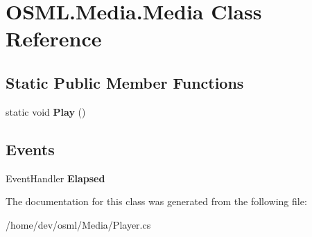 \hypertarget{classOSML_1_1Media_1_1Media}{}\section{O\+S\+M\+L.\+Media.\+Media Class Reference}
\label{classOSML_1_1Media_1_1Media}
\subsection*{Static Public Member Functions}
\begin{DoxyCompactItemize}
\item 
\mbox{\label{classOSML_1_1Media_1_1Media_a8236dd83825d723364989289e2971ee4}} 
static void {\bfseries Play} ()
\end{DoxyCompactItemize}
\subsection*{Events}
\begin{DoxyCompactItemize}
\item 
\mbox{\label{classOSML_1_1Media_1_1Media_af932ec4bf9851fa9e176cfee360a8cc7}} 
Event\+Handler {\bfseries Elapsed}
\end{DoxyCompactItemize}


The documentation for this class was generated from the following file\+:\begin{DoxyCompactItemize}
\item 
/home/dev/osml/\+Media/Player.\+cs\end{DoxyCompactItemize}
